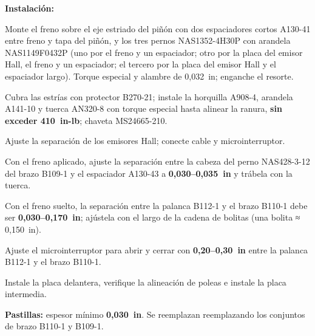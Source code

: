 \textbf{Instalación:}
\begin{pasos}
\item Monte el freno sobre el eje estriado del piñón con dos espaciadores cortos A130-41 entre freno y tapa del piñón, y los tres pernos NAS1352-4H30P con arandela NAS1149F0432P (uno por el freno y un espaciador; otro por la placa del emisor Hall, el freno y un espaciador; el tercero por la placa del emisor Hall y el espaciador largo). Torque especial y alambre de 0,032~in; enganche el resorte.
\item Cubra las estrías con protector B270-21; instale la horquilla A908-4, arandela A141-10 y tuerca AN320-8 con torque especial hasta alinear la ranura, \textbf{sin exceder 410~in-lb}; chaveta MS24665-210.
\item Ajuste la separación de los emisores Hall; conecte cable y microinterruptor.
\item Con el freno aplicado, ajuste la separación entre la cabeza del perno NAS428-3-12 del brazo B109-1 y el espaciador A130-43 a \textbf{0,030--0,035~in} y trábela con la tuerca.
\item Con el freno suelto, la separación entre la palanca B112-1 y el brazo B110-1 debe ser \textbf{0,030--0,170~in}; ajústela con el largo de la cadena de bolitas (una bolita ≈ 0,150~in).
\item Ajuste el microinterruptor para abrir y cerrar con \textbf{0,20--0,30~in} entre la palanca B112-1 y el brazo B110-1.
\item Instale la placa delantera, verifique la alineación de poleas e instale la placa intermedia.
\end{pasos}

\textbf{Pastillas:} espesor mínimo \textbf{0,030~in}. Se reemplazan reemplazando los conjuntos de brazo B110-1 y B109-1.
